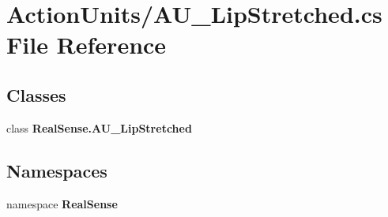 \section{Action\+Units/\+A\+U\+\_\+\+Lip\+Stretched.cs File Reference}
\label{_a_u___lip_stretched_8cs}
\subsection*{Classes}
\begin{DoxyCompactItemize}
\item 
class \textbf{ Real\+Sense.\+A\+U\+\_\+\+Lip\+Stretched}
\end{DoxyCompactItemize}
\subsection*{Namespaces}
\begin{DoxyCompactItemize}
\item 
namespace \textbf{ Real\+Sense}
\end{DoxyCompactItemize}
